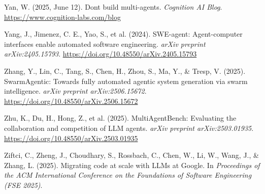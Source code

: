 Yan, W. (2025, June 12). Don\textquotesingle t build multi-agents.
\emph{Cognition AI Blog}. \url{https://www.cognition-labs.com/blog}

Yang, J., Jimenez, C. E., Yao, S., et al. (2024). SWE-agent:
Agent-computer interfaces enable automated software engineering.
\emph{arXiv preprint arXiv:2405.15793}.
\url{https://doi.org/10.48550/arXiv.2405.15793}

Zhang, Y., Lin, C., Tang, S., Chen, H., Zhou, S., Ma, Y., \& Tresp, V.
(2025). SwarmAgentic: Towards fully automated agentic system generation
via swarm intelligence. \emph{arXiv preprint arXiv:2506.15672}.
\url{https://doi.org/10.48550/arXiv.2506.15672}

Zhu, K., Du, H., Hong, Z., et al. (2025). MultiAgentBench: Evaluating
the collaboration and competition of LLM agents. \emph{arXiv preprint
arXiv:2503.01935}. \url{https://doi.org/10.48550/arXiv.2503.01935}

Ziftci, C., Zheng, J., Choudhary, S., Rossbach, C., Chen, W., Li, W.,
Wang, J., \& Zhang, L. (2025). Migrating code at scale with LLMs at
Google. In \emph{Proceedings of the ACM International Conference on the
Foundations of Software Engineering (FSE 2025)}.

\endgroup
